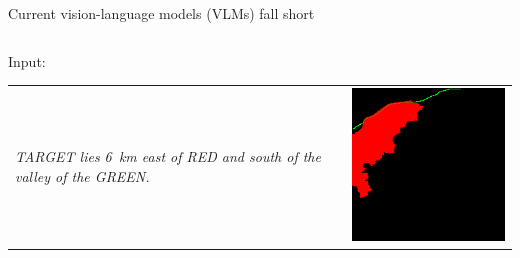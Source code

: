 \documentclass[14pt,aspectratio=169]{beamer}
\begin{document}
\begin{frame}{Current vision-language models (VLMs) fall short}
\begin{columns}
\begin{column}{0.48\textwidth}
Input: \\
\smallskip
\begin{tabular}{ p{} l @{}}
\textit{TARGET lies 6 km east of RED and south of the valley of the GREEN.} &
\includegraphics[align=t,width=.25\textwidth]{compgeo/GL006_046_oracle_input.png}
\end{tabular}


\end{column}
\end{columns}
\end{frame}
\end{document}
